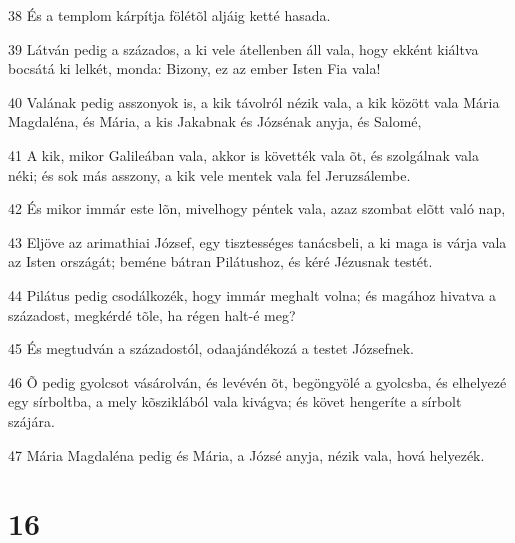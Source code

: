 \par 38 És a templom kárpítja fölétõl aljáig ketté hasada.
\par 39 Látván pedig a százados, a ki vele átellenben áll vala, hogy ekként kiáltva bocsátá ki lelkét, monda: Bizony, ez az ember Isten Fia vala!
\par 40 Valának pedig asszonyok is, a kik távolról nézik vala, a kik között vala Mária Magdaléna,  és Mária, a kis Jakabnak és Józsénak anyja, és Salomé,
\par 41 A kik, mikor Galileában vala, akkor is követték vala õt, és szolgálnak vala néki; és sok más asszony, a kik vele mentek vala fel Jeruzsálembe.
\par 42 És mikor immár este lõn, mivelhogy péntek vala, azaz szombat elõtt való nap,
\par 43 Eljöve az arimathiai József, egy tisztességes tanácsbeli, a ki maga is várja vala az Isten országát; beméne bátran Pilátushoz, és kéré Jézusnak testét.
\par 44 Pilátus pedig csodálkozék, hogy immár meghalt volna; és magához hivatva a századost, megkérdé tõle, ha régen halt-é meg?
\par 45 És megtudván a századostól, odaajándékozá a testet Józsefnek.
\par 46 Õ pedig gyolcsot vásárolván, és levévén õt, begöngyölé a gyolcsba, és elhelyezé egy sírboltba, a mely kõsziklából vala kivágva; és követ hengeríte a sírbolt szájára.
\par 47 Mária Magdaléna pedig és Mária, a Józsé anyja, nézik vala, hová helyezék.

\chapter{16}

